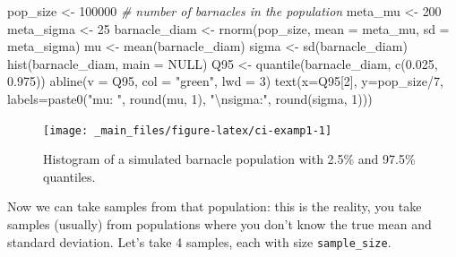 \documentclass[
  11pt,
  a4paper,
]{book}
\newenvironment{Shaded}{\begin{snugshade}}{\end{snugshade}}
\newcommand{\AttributeTok}[1]{\textcolor[rgb]{0.77,0.63,0.00}{#1}}
\newcommand{\CommentTok}[1]{\textcolor[rgb]{0.56,0.35,0.01}{\textit{#1}}}
\newcommand{\ConstantTok}[1]{\textcolor[rgb]{0.00,0.00,0.00}{#1}}
\newcommand{\DecValTok}[1]{\textcolor[rgb]{0.00,0.00,0.81}{#1}}
\newcommand{\FloatTok}[1]{\textcolor[rgb]{0.00,0.00,0.81}{#1}}
\newcommand{\FunctionTok}[1]{\textcolor[rgb]{0.00,0.00,0.00}{#1}}
\newcommand{\NormalTok}[1]{#1}
\newcommand{\OtherTok}[1]{\textcolor[rgb]{0.56,0.35,0.01}{#1}}
\newcommand{\SpecialCharTok}[1]{\textcolor[rgb]{0.00,0.00,0.00}{#1}}
\newcommand{\StringTok}[1]{\textcolor[rgb]{0.31,0.60,0.02}{#1}}
\begin{document}
\begin{Shaded}
\begin{Highlighting}[]
\NormalTok{pop\_size }\OtherTok{\textless{}{-}} \DecValTok{100000}  \CommentTok{\# number of barnacles in the population}
\NormalTok{meta\_mu }\OtherTok{\textless{}{-}} \DecValTok{200}
\NormalTok{meta\_sigma }\OtherTok{\textless{}{-}} \DecValTok{25}
\NormalTok{barnacle\_diam }\OtherTok{\textless{}{-}} \FunctionTok{rnorm}\NormalTok{(pop\_size, }\AttributeTok{mean =}\NormalTok{ meta\_mu, }\AttributeTok{sd =}\NormalTok{ meta\_sigma)}
\NormalTok{mu }\OtherTok{\textless{}{-}} \FunctionTok{mean}\NormalTok{(barnacle\_diam)}
\NormalTok{sigma }\OtherTok{\textless{}{-}} \FunctionTok{sd}\NormalTok{(barnacle\_diam)}
\FunctionTok{hist}\NormalTok{(barnacle\_diam, }\AttributeTok{main =} \ConstantTok{NULL}\NormalTok{)}
\NormalTok{Q95 }\OtherTok{\textless{}{-}} \FunctionTok{quantile}\NormalTok{(barnacle\_diam, }\FunctionTok{c}\NormalTok{(}\FloatTok{0.025}\NormalTok{, }\FloatTok{0.975}\NormalTok{))}
\FunctionTok{abline}\NormalTok{(}\AttributeTok{v =}\NormalTok{ Q95, }\AttributeTok{col =} \StringTok{"green"}\NormalTok{, }\AttributeTok{lwd =} \DecValTok{3}\NormalTok{)}
\FunctionTok{text}\NormalTok{(}\AttributeTok{x=}\NormalTok{Q95[}\DecValTok{2}\NormalTok{], }\AttributeTok{y=}\NormalTok{pop\_size}\SpecialCharTok{/}\DecValTok{7}\NormalTok{, }
     \AttributeTok{labels=}\FunctionTok{paste0}\NormalTok{(}\StringTok{"mu: "}\NormalTok{, }\FunctionTok{round}\NormalTok{(mu, }\DecValTok{1}\NormalTok{), }\StringTok{"}\SpecialCharTok{\textbackslash{}n}\StringTok{sigma:"}\NormalTok{, }\FunctionTok{round}\NormalTok{(sigma, }\DecValTok{1}\NormalTok{)))}
\end{Highlighting}
\end{Shaded}

\begin{figure}

{\centering \texttt{[image: \_main\_files/figure-latex/ci-examp1-1]} 

}

\caption{Histogram of a simulated barnacle population with 2.5\% and 97.5\% quantiles.}\label{fig:ci-examp1}
\end{figure}

Now we can take samples from that population: this is the reality, you take samples (usually) from populations where you don't know the true mean and standard deviation. Let's take 4 samples, each with size \texttt{sample\_size}.
\end{document}
